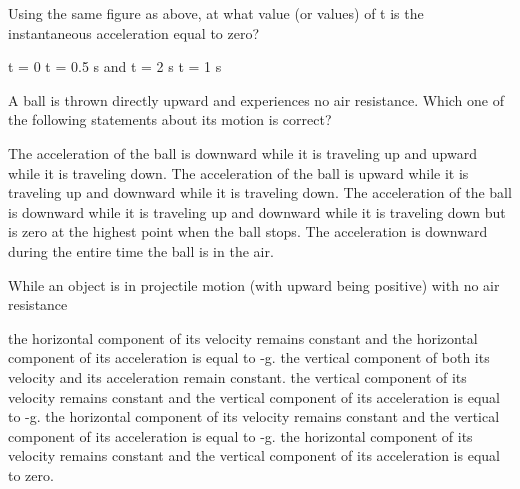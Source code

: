 \documentclass[11pt]{exam}
\begin{document}
\begin{questions}
\question
\iftoggle{hideans}{\underline{~~~~~~~~~~~}}{\underline{~~~~~C~~~~~}}
Using the same figure as above, at what value (or values) of t is the instantaneous acceleration equal to zero?
\begin{choices}
   \choice t = 0
   \choice t = 0.5 s and t = 2 s
   \choice t = 1 s
\end{choices}

\question
\iftoggle{hideans}{\underline{~~~~~~~~~~~}}{\underline{~~~~~D~~~~~}}
A ball is thrown directly upward and experiences no air resistance. Which one of the following statements about its motion is correct?
\begin{choices}
   \choice The acceleration of the ball is downward while it is traveling up and upward while it is traveling down.
   \choice The acceleration of the ball is upward while it is traveling up and downward while it is traveling down.
   \choice The acceleration of the ball is downward while it is traveling up and downward while it is traveling down but is zero at the highest point when the ball stops.
   \choice The acceleration is downward during the entire time the ball is in the air.
\end{choices}


\question
\iftoggle{hideans}{\underline{~~~~~~~~~~~}}{\underline{~~~~~D~~~~~}}
While an object is in projectile motion (with upward being positive) with no air resistance
\begin{choices}
   \choice the horizontal component of its velocity remains constant and the horizontal component of its acceleration is equal to -g.
   \choice the vertical component of both its velocity and its acceleration remain constant.
   \choice the vertical component of its velocity remains constant and the vertical component of its acceleration is equal to -g.
   \choice the horizontal component of its velocity remains constant and the vertical component of its acceleration is equal to -g.
   \choice the horizontal component of its velocity remains constant and the vertical component of its acceleration is equal to zero.
\end{choices}


\end{questions}
\end{document}
